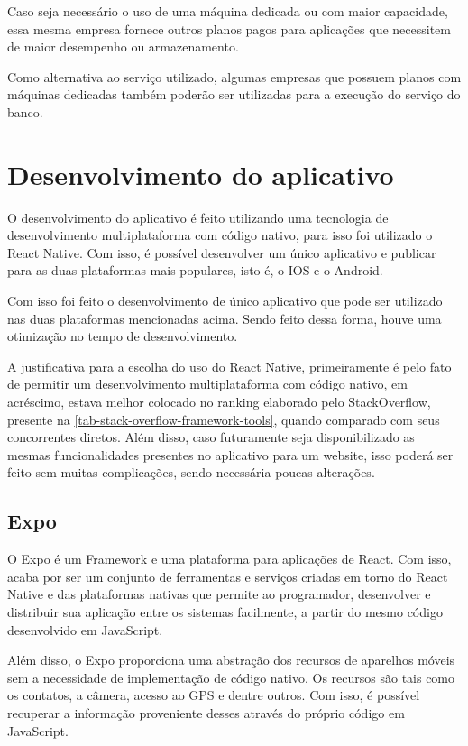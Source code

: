 Caso seja necessário o uso de uma máquina dedicada ou com maior capacidade, essa mesma empresa fornece outros planos pagos para aplicações que necessitem de maior desempenho ou armazenamento.

Como alternativa ao serviço utilizado, algumas empresas que possuem planos com máquinas dedicadas também poderão ser utilizadas para a execução do serviço do banco.

\section{Desenvolvimento do aplicativo}\label{desenvApp}

O desenvolvimento do aplicativo é feito utilizando uma tecnologia de desenvolvimento multiplataforma com código nativo, para isso foi utilizado o React Native. Com isso, é possível desenvolver um único aplicativo e publicar para as duas plataformas mais populares, isto é, o IOS e o Android.

Com isso foi feito o desenvolvimento de único aplicativo que pode ser utilizado nas duas plataformas mencionadas acima. Sendo feito dessa forma, houve uma otimização no tempo de desenvolvimento.

A justificativa para a escolha do uso do React Native, primeiramente é pelo fato de permitir um desenvolvimento multiplataforma com código nativo, em acréscimo, estava melhor colocado no ranking elaborado pelo StackOverflow, presente na \autoref{tab-stack-overflow-framework-tools}, quando comparado com seus concorrentes diretos. Além disso, caso futuramente seja disponibilizado as mesmas funcionalidades presentes no aplicativo para um website, isso poderá ser feito sem muitas complicações, sendo necessária poucas alterações.

\subsection{Expo}

O Expo é um Framework e uma plataforma para aplicações de React. Com isso, acaba por ser um conjunto de ferramentas e serviços criadas em torno do React Native e das plataformas nativas que permite ao programador, desenvolver e distribuir sua aplicação entre os sistemas facilmente, a partir do mesmo código desenvolvido em JavaScript.

Além disso, o Expo proporciona uma abstração dos recursos de aparelhos móveis sem a necessidade de implementação de código nativo. Os recursos são tais como os contatos, a câmera, acesso ao GPS e dentre outros. Com isso, é possível recuperar a informação proveniente desses através do próprio código em JavaScript.

